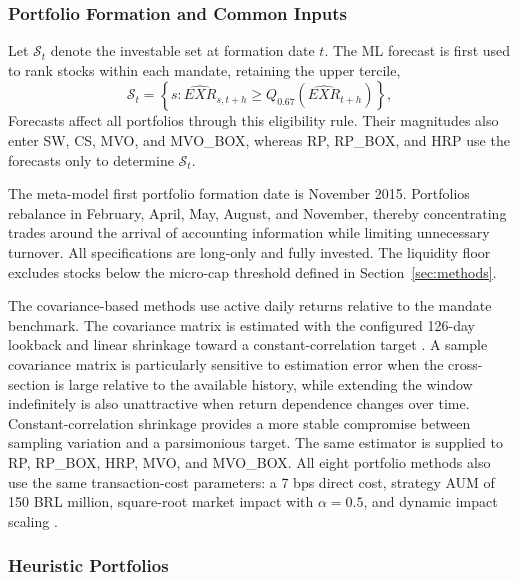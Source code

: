 \documentclass[preprint,12pt,authoryear]{elsarticle}
\begin{document}
\begin{appendices}
\subsubsection{Portfolio Formation and Common Inputs}

Let $\mathcal{S}_{t}$ denote the investable set at formation date $t$. The ML forecast is first used to rank stocks within each mandate, retaining the upper tercile,
\begin{equation}
\mathcal{S}_{t}=\left\{s:\widehat{EXR}_{s,t+h}\geq
Q_{0.67}\left(\widehat{EXR}_{t+h}\right)\right\},
\end{equation}
Forecasts affect all portfolios through this eligibility rule. Their magnitudes also enter SW, CS, MVO, and MVO\_BOX, whereas RP, RP\_BOX, and HRP use the forecasts only to determine $\mathcal{S}_{t}$.

The meta-model first portfolio formation date is November 2015. Portfolios rebalance in February, April, May, August, and November, thereby concentrating trades around the arrival of accounting information while limiting unnecessary turnover. All specifications are long-only and fully invested. The liquidity floor excludes stocks below the micro-cap threshold defined in Section~\ref{sec:methods}.

The covariance-based methods use active daily returns relative to the mandate benchmark. The covariance matrix is estimated with the configured 126-day lookback and linear shrinkage toward a constant-correlation target \citep{ledoitwolf2003,ledoitwolf2004}. A sample covariance matrix is particularly sensitive to estimation error when the cross-section is large relative to the available history, while extending the window indefinitely is also unattractive when return dependence changes over time. Constant-correlation shrinkage provides a more stable compromise between sampling variation and a parsimonious target. The same estimator is supplied to RP, RP\_BOX, HRP, MVO, and MVO\_BOX. All eight portfolio methods also use the same transaction-cost parameters: a 7 bps direct cost, strategy AUM of 150 BRL million, square-root market impact with $\alpha=0.5$, and dynamic impact scaling \citep{barra1997}.

\subsubsection{Heuristic Portfolios}


\end{appendices}
\end{document}
